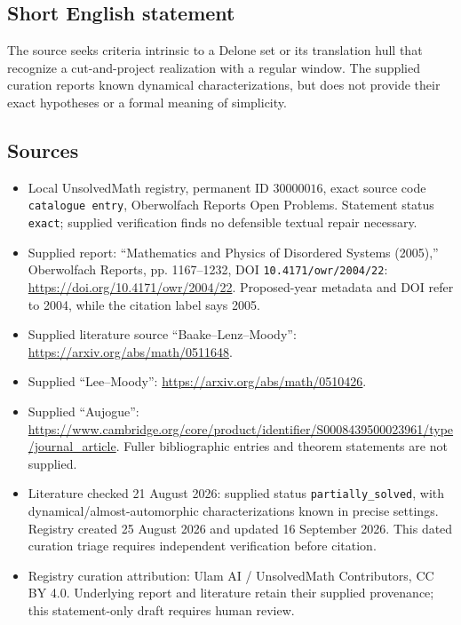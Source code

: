 \documentclass[11pt]{article}
\begin{document}
\subsection{Short English statement}
The source seeks criteria intrinsic to a Delone set or its translation hull that recognize a cut-and-project realization with a regular window. The supplied curation reports known dynamical characterizations, but does not provide their exact hypotheses or a formal meaning of simplicity.
\subsection{Sources}
\begin{itemize}
\item Local UnsolvedMath registry, permanent ID \(30000016\), exact source code \texttt{catalogue entry}, Oberwolfach Reports Open Problems. Statement status \texttt{exact}; supplied verification finds no defensible textual repair necessary.
\item Supplied report: ``Mathematics and Physics of Disordered Systems (2005),'' Oberwolfach Reports, pp. 1167--1232, DOI \texttt{10.4171/owr/2004/22}: \url{https://doi.org/10.4171/owr/2004/22}. Proposed-year metadata and DOI refer to 2004, while the citation label says 2005.
\item Supplied literature source ``Baake--Lenz--Moody'': \url{https://arxiv.org/abs/math/0511648}.
\item Supplied ``Lee--Moody'': \url{https://arxiv.org/abs/math/0510426}.
\item Supplied ``Aujogue'': \url{https://www.cambridge.org/core/product/identifier/S0008439500023961/type/journal_article}. Fuller bibliographic entries and theorem statements are not supplied.
\item Literature checked 21 August 2026: supplied status \texttt{partially\_solved}, with dynamical/almost-automorphic characterizations known in precise settings. Registry created 25 August 2026 and updated 16 September 2026. This dated curation triage requires independent verification before citation.
\item Registry curation attribution: Ulam AI / UnsolvedMath Contributors, CC BY 4.0. Underlying report and literature retain their supplied provenance; this statement-only draft requires human review.
\end{itemize}
\end{document}

